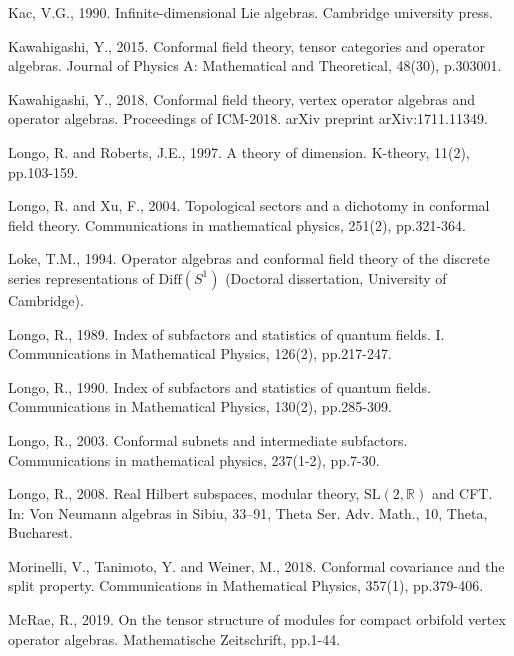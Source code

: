 \documentclass[11pt,b5paper,notitlepage]{article}
\theoremstyle{definition}
\theoremstyle{plain}
\newcommand{\mbb}{\mathbb}
\numberwithin{equation}{subsection}
\begin{document}
\begin{thebibliography}{999999}
Kac, V.G., 1990. Infinite-dimensional Lie algebras. Cambridge university press.

Kawahigashi, Y., 2015. Conformal field theory, tensor categories and operator algebras. Journal of Physics A: Mathematical and Theoretical, 48(30), p.303001.

Kawahigashi, Y., 2018. Conformal field theory, vertex operator algebras and operator algebras. Proceedings of ICM-2018. arXiv preprint arXiv:1711.11349.




Longo, R. and Roberts, J.E., 1997. A theory of dimension. K-theory, 11(2), pp.103-159.

Longo, R. and Xu, F., 2004. Topological sectors and a dichotomy in conformal field theory. Communications in mathematical physics, 251(2), pp.321-364.

Loke, T.M., 1994. Operator algebras and conformal field theory of the discrete series representations of $\mathrm{Diff}(S^1)$ (Doctoral dissertation, University of Cambridge).

Longo, R., 1989. Index of subfactors and statistics of quantum fields. I. Communications in Mathematical Physics, 126(2), pp.217-247.

Longo, R., 1990. Index of subfactors and statistics of quantum fields. Communications in Mathematical Physics, 130(2), pp.285-309.

Longo, R., 2003. Conformal subnets and intermediate subfactors. Communications in mathematical physics, 237(1-2), pp.7-30.

Longo, R., 2008. Real Hilbert subspaces, modular theory, $\mathrm{SL}(2,\mbb R)$ and CFT. In: Von Neumann algebras in Sibiu, 33–91, Theta Ser. Adv. Math., 10, Theta, Bucharest.

Morinelli, V., Tanimoto, Y. and Weiner, M., 2018. Conformal covariance and the split property. Communications in Mathematical Physics, 357(1), pp.379-406.

McRae, R., 2019. On the tensor structure of modules for compact orbifold vertex operator algebras. Mathematische Zeitschrift, pp.1-44.




\end{thebibliography}
\end{document}
